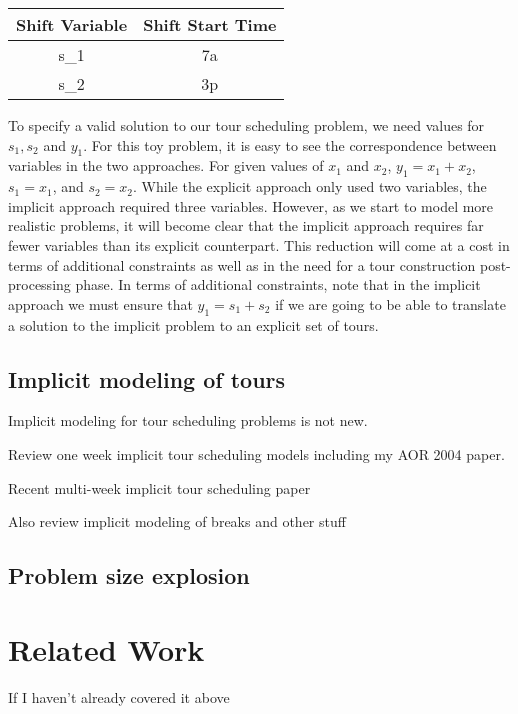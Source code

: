 \documentclass{article}
\begin{document}
\begin{tabular}{|c|c|}
\hline 
Shift Variable & Shift Start Time \\ 
\hline 
s_1 & 7a \\ 
\hline 
s_2 & 3p \\ 
\hline 
\end{tabular}

To specify a valid solution to our tour scheduling problem, we need values for $s_1, s_2$ and $y_1$. For this toy problem, it is easy to see the correspondence between variables in the two approaches. For given values of $x_1$ and $x_2$, $y_1 = x_1 + x_2$, $s_1 = x_1$, and $s_2 = x_2$. While the explicit approach only used two variables, the implicit approach required three variables. However, as we start to model more realistic problems, it will become clear that the implicit approach requires far fewer variables than its explicit counterpart. This reduction will come at a cost in terms of additional constraints as well as in the need for a tour construction post-processing phase. In terms of additional constraints, note that in the implicit approach we must ensure that $y_1 = s_1 + s_2$ if we are going to be able to translate a solution to the implicit problem to an explicit set of tours.

\subsection{Implicit modeling of tours}

Implicit modeling for tour scheduling problems is not new. 

Review one week implicit tour scheduling models including my AOR 2004 paper.

Recent multi-week implicit tour scheduling paper

Also review implicit modeling of breaks and other stuff

\subsection{Problem size explosion}
\label{subsec-explosion}




\section{Related Work}
\label{sec-relatedwork}

If I haven't already covered it above
 
\end{document}
